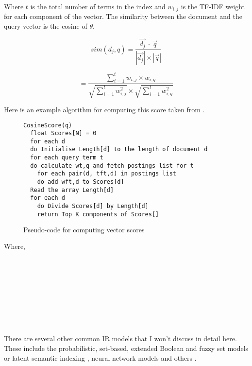 Where $t$ is the total number of terms in the index and $w_{i,j}$ is the TF-IDF weight for each component of the vector. The similarity between the document and the query vector is the cosine of $\theta$.

\begin{equation}
sim\left(d_j,q \right) = \frac{\vec{d_j} \ \cdot \ \vec{q}}{\left|\vec{d_j}\right| \times \left|\vec{q}\right|}
\end{equation}

\begin{equation}
= \frac{\sum_{i=1}^{t}w_{i,j} \times w_{i,q}}
{\sqrt{\sum_{i=1}^{t}w_{i,j}^{2}} \times \sqrt{\sum_{i=1}^{t}w_{i,q}^{2}}}
\end{equation}

Here is an example algorithm for computing this score taken from \citep[p.125]{Manning2009}.

\begin{figure}
\begin{lstlisting}
CosineScore(q)
  float Scores[N] = 0
  for each d
  do Initialise Length[d] to the length of document d
  for each query term t
  do calculate wt,q and fetch postings list for t
    for each pair(d, tft,d) in postings list
    do add wft,d to Scores[d]
  Read the array Length[d]
  for each d
  	do Divide Scores[d] by Length[d]
  	return Top K components of Scores[]
\end{lstlisting}
\caption[Pseudo-code for computing vector scores]{Pseudo-code for computing vector scores}
\label{fig:VectorScores}
\end{figure}

Where,\\
 \\
 \\
 \\
 \\
 \\
 \\
 \\
 \\
 

There are several other common IR models that I won't discuss in detail here. These include the probabilistic, set-based, extended Boolean and fuzzy set \citep{Miyamoto2010, Miyamoto1988, Srinivasan2001, Widyantoro2001, Miyamoto1986} models or latent semantic indexing \citep{Deerwester1990}, neural network models and others \citep{Macdonald2009, Schuetze1998, Schuetze}.


